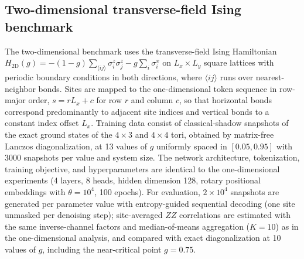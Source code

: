 \subsection{Two-dimensional transverse-field Ising benchmark}
The two-dimensional benchmark uses the transverse-field Ising Hamiltonian
$H_{\mathrm{2D}}(g)=-(1-g)\sum_{\langle ij\rangle}\sigma^z_i\sigma^z_j
-g\sum_i \sigma^x_i$ on $L_x\times L_y$ square lattices with periodic
boundary conditions in both directions, where $\langle ij\rangle$ runs over
nearest-neighbor bonds. Sites are mapped to the one-dimensional token
sequence in row-major order, $s=rL_x+c$ for row $r$ and column $c$, so that
horizontal bonds correspond predominantly to adjacent site indices and
vertical bonds to a constant index offset $L_x$. Training data consist of
classical-shadow snapshots of the exact ground states of the $4\times3$ and
$4\times4$ tori, obtained by matrix-free Lanczos diagonalization, at 13
values of $g$ uniformly spaced in $[0.05,0.95]$ with $3000$ snapshots per
value and system size. The network architecture, tokenization, training
objective, and hyperparameters are identical to the one-dimensional
experiments (4 layers, 8 heads, hidden dimension 128, rotary positional
embeddings with $\theta=10^4$, 100 epochs). For evaluation, $2\times10^4$
snapshots are generated per parameter value with entropy-guided sequential
decoding (one site unmasked per denoising step); site-averaged $ZZ$
correlations are estimated with the same inverse-channel factors and
median-of-means aggregation ($K=10$) as in the one-dimensional analysis,
and compared with exact diagonalization at 10 values of $g$, including the
near-critical point $g=0.75$.
